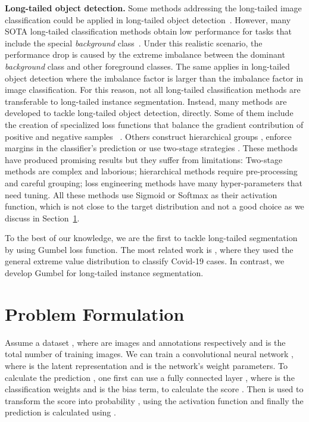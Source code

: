 \documentclass[runningheads]{llncs}
\begin{document}
\noindent \textbf{Long-tailed  object detection.} Some methods addressing the long-tailed image classification could be applied in long-tailed  object detection~\cite{Ren2020balms,tan2020equalization,wang2021seesaw,kang2019decoupling}. However, many SOTA long-tailed classification methods obtain low performance for tasks that include the special \textit{background} class~\cite{mullapudi2021background}. Under this realistic scenario, the performance drop is caused by the extreme imbalance between the dominant \textit{background} class and other foreground classes. 
The same applies in long-tailed  object detection where the imbalance factor is  larger than the imbalance factor in image classification. For this reason, not all long-tailed  classification methods are transferable to long-tailed  instance segmentation. Instead, many methods are developed to tackle long-tailed  object detection, directly. Some of them include the creation of specialized loss functions that balance the gradient contribution of positive and negative samples ~\cite{tan2020equalization,tan2021equalization,wang2021adaptive,wang2021seesaw,peng2020large}. Others construct hierarchical groups \cite{li2020overcoming,wu2020forest}, enforce margins in the classifier's prediction \cite{feng2021exploring,Ren2020balms,tang2020long} or use two-stage strategies \cite{wang2020devil,kang2019decoupling,zhang2021distribution}. These methods have produced promising results but they suffer from limitations: Two-stage methods are complex and laborious; hierarchical methods require pre-processing and careful grouping; loss engineering methods have many hyper-parameters that need tuning. All these methods use Sigmoid or Softmax as their activation function, which is not close to the target distribution and not a good choice as we discuss in Section~\ref{sec:problem}. 

To the best of our knowledge, we are the first to tackle long-tailed segmentation by using Gumbel loss function.
The most related work is \cite{bridge2020introducing}, where they used the general extreme value distribution to classify Covid-19 cases. In contrast, we develop Gumbel for long-tailed instance segmentation. 

\section{Problem Formulation}
\label{sec:problem}

Assume a dataset , where  are images and annotations respectively and  is the total number of training images. We can train a convolutional neural network , where  is the latent representation and  is the network's weight parameters. To calculate the prediction , one first can use a fully connected layer , where  is the classification weights and  is the bias term, to calculate the score . Then  is used to transform the score  into probability , using the activation function  and finally the prediction  is calculated using .
\end{document}
